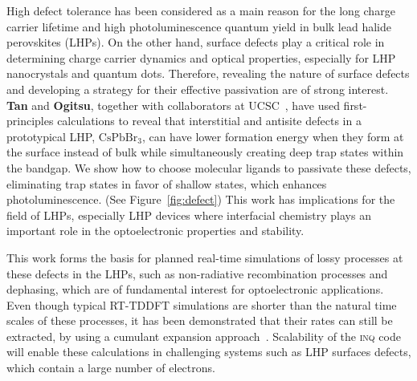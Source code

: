 High defect tolerance has been considered as a main reason for the long charge carrier lifetime and high photoluminescence quantum yield in bulk lead halide perovskites (LHPs). 
On the other hand, surface defects play a critical role in determining charge carrier dynamics and optical properties, especially for LHP nanocrystals and quantum dots. Therefore, revealing the nature of surface defects and developing a strategy for their effective passivation are of strong interest. 
{\bf Tan} and {\bf Ogitsu}, together with collaborators at UCSC~\cite{Smart2021}, have used first-principles calculations to reveal that interstitial and antisite defects in a prototypical LHP, \(\mathrm{CsPbBr_3}\), can have lower formation energy when they form at the surface instead of bulk while simultaneously creating deep trap states within the bandgap.
We show how to choose molecular ligands to passivate these defects, eliminating trap states in favor of shallow states, which enhances photoluminescence. 
(See Figure~\ref{fig:defect}) This work has implications for  the field of LHPs, especially LHP devices where interfacial chemistry plays an important role in the optoelectronic properties and stability.

This work forms the basis for planned real-time simulations of lossy processes at these defects in the LHPs, such as non-radiative recombination processes and dephasing, which are of fundamental interest for optoelectronic applications. 
Even though typical RT-TDDFT simulations are shorter than the natural time scales of these processes, it has been demonstrated that their rates can still be extracted, by using a cumulant expansion approach~\cite{Qiao2020}. 
Scalability of the \textsc{inq} code will enable these calculations in challenging systems such as LHP surfaces defects, which contain a large number of electrons.     

